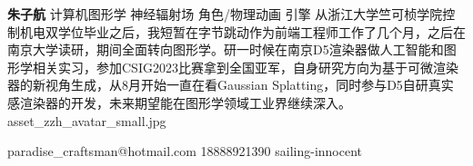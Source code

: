 \header
{\songti \bf 朱子航 }
{\songti 计算机图形学 \quad 神经辐射场 \quad 角色/物理动画 \quad 引擎}
{
    \songti 从浙江大学竺可桢学院控制机电双学位毕业之后，我短暂在字节跳动作为前端工程师工作了几个月，之后在南京大学读研，期间全面转向图形学。研一时候在南京D5渲染器做人工智能和图形学相关实习，参加CSIG2023比赛拿到全国亚军，自身研究方向为基于可微渲染器的新视角生成，从8月开始一直在看Gaussian Splatting，同时参与D5自研真实感渲染器的开发，未来期望能在图形学领域工业界继续深入。
}
{asset_zzh_avatar_small.jpg}

\contactband
{paradise\_craftsman@hotmail.com}
{18888921390}
{sailing-innocent}

\vspace{\headerheight}